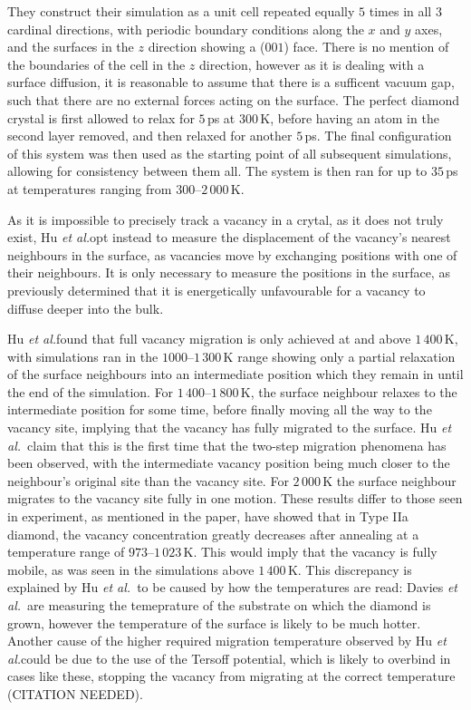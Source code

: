\documentclass[10pt,a4paper,twocolumn,twoside]{extarticle}
\newcommand{\al}{\emph{et al.}}
\begin{document}
They construct their simulation as a unit cell repeated equally $5$ times in all $3$ cardinal directions, with periodic boundary conditions along the $x$ and $y$ axes, and the surfaces in the $z$ direction showing a ($001$) face. There is no mention of the boundaries of the cell in the $z$ direction, however as it is dealing with a surface diffusion, it is reasonable to assume that there is a sufficent vacuum gap, such that there are no external forces acting on the surface. The perfect diamond crystal is first allowed to relax for $5$\,ps at $300$\,K, before having an atom in the second layer removed, and then relaxed for another $5$\,ps. The final configuration of this system was then used as the starting point of all subsequent simulations, allowing for consistency between them all. The system is then ran for up to $35$\,ps at temperatures ranging from $300$--$2\,000$\,K. 

As it is impossible to precisely track a vacancy in a crytal, as it does not truly exist, Hu \al opt instead to measure the displacement of the vacancy's nearest neighbours in the surface, as vacancies move by exchanging positions with one of their neighbours. It is only necessary to measure the positions in the surface, as \textcite{Halicioglu} previously determined that it is energetically unfavourable for a vacancy to diffuse deeper into the bulk. 

Hu \al found that full vacancy migration is only achieved at and above $1\,400$\,K, with simulations ran in the $1000$--$1\,300$\,K range showing only a partial relaxation of the surface neighbours into an intermediate position which they remain in until the end of the simulation. For $1\,400$--$1\,800$\,K, the surface neighbour relaxes to the intermediate position for some time, before finally moving all the way to the vacancy site, implying that the vacancy has fully migrated to the surface. Hu \al~claim that this is the first time that the two-step migration phenomena has been observed, with the intermediate vacancy position being much closer to the neighbour's original site than the vacancy site. For $2\,000$\,K the surface neighbour migrates to the vacancy site fully in one motion. These results differ to those seen in experiment, as mentioned in the paper, \textcite{Davies} have showed that in Type IIa diamond, the vacancy concentration greatly decreases after annealing at a temperature range of $973$--$1\,023$\,K. This would imply that the vacancy is fully mobile, as was seen in the simulations above $1\,400$\,K. This discrepancy is explained by Hu \al~to be caused by how the temperatures are read: Davies \al~are measuring the temeprature of the substrate on which the diamond is grown, however the temperature of the surface is likely to be much hotter. Another cause of the higher required migration temperature observed by Hu \al could be due to the use of the Tersoff potential, which is likely to overbind in cases like these, stopping the vacancy from migrating at the correct temperature (CITATION NEEDED).
\end{document}
